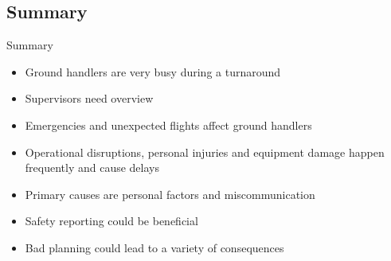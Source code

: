 \subsection{Summary}
\begin{frame}{Summary}{}
	\begin{itemize}
		\item Ground handlers are very busy during a turnaround
		\item Supervisors need overview
		\item Emergencies and unexpected flights affect ground handlers
		\item Operational disruptions, personal injuries and equipment damage happen frequently and cause delays
		\item Primary causes are personal factors and miscommunication
		\item Safety reporting could be beneficial
		\item Bad planning could lead to a variety of consequences
	\end{itemize}
\end{frame}